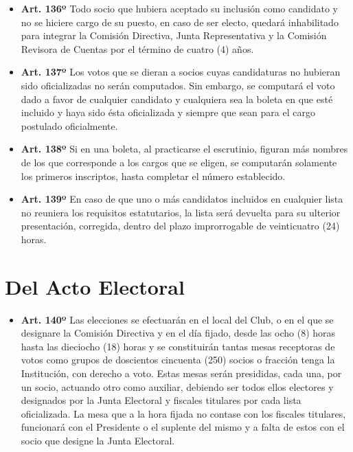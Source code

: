 \documentclass[openany]{book}
\providecommand{\tightlist}{%
  \setlength{\itemsep}{0pt}\setlength{\parskip}{0pt}}
\begin{document}
\begin{itemize}
\tightlist
\item
  \textbf{Art. 136º}
  Todo socio que hubiera aceptado su inclusión como candidato y no se hiciere cargo de su puesto, en caso de ser electo, quedará inhabilitado para integrar la Comisión Directiva, Junta Representativa y la Comisión Revisora de Cuentas por el término de cuatro (4) años.
\end{itemize}

\begin{itemize}
\tightlist
\item
  \textbf{Art. 137º}
  Los votos que se dieran a socios cuyas candidaturas no hubieran sido oficializadas no serán computados. Sin embargo, se computará el voto dado a favor de cualquier candidato y cualquiera sea la boleta en que esté incluido y haya sido ésta oficializada y siempre que sean para el cargo postulado oficialmente.
\end{itemize}

\begin{itemize}
\tightlist
\item
  \textbf{Art. 138º}
  Si en una boleta, al practicarse el escrutinio, figuran más nombres de los que corresponde a los cargos que se eligen, se computarán solamente los primeros inscriptos, hasta completar el número establecido.
\end{itemize}

\begin{itemize}
\tightlist
\item
  \textbf{Art. 139º}
  En caso de que uno o más candidatos incluidos en cualquier lista no reuniera los requisitos estatutarios, la lista será devuelta para su ulterior presentación, corregida, dentro del plazo improrrogable de veinticuatro (24) horas.
\end{itemize}

\hypertarget{del-acto-electoral}{%
\section{Del Acto Electoral}\label{del-acto-electoral}}

\begin{itemize}
\tightlist
\item
  \textbf{Art. 140º}
  Las elecciones se efectuarán en el local del Club, o en el que se designare la Comisión Directiva y en el día fijado, desde las ocho (8) horas hasta las dieciocho (18) horas y se constituirán tantas mesas receptoras de votos como grupos de doscientos cincuenta (250) socios o fracción tenga la Institución, con derecho a voto. Estas mesas serán presididas, cada una, por un socio, actuando otro como auxiliar, debiendo ser todos ellos electores y designados por la Junta Electoral y fiscales titulares por cada lista oficializada. La mesa que a la hora fijada no contase con los fiscales titulares, funcionará con el Presidente o el suplente del mismo y a falta de estos con el socio que designe la Junta Electoral.
\end{itemize}
\end{document}
